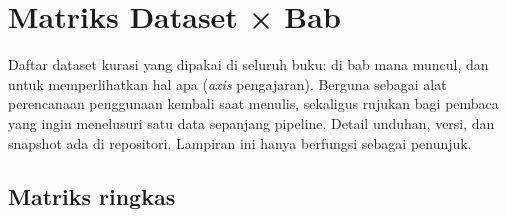 \chapter{Matriks Dataset × Bab}\label{matriks-dataset-bab}

Daftar dataset kurasi yang dipakai di seluruh buku: di bab mana muncul, dan untuk memperlihatkan hal apa (\emph{axis} pengajaran). Berguna sebagai alat perencanaan penggunaan kembali saat menulis, sekaligus rujukan bagi pembaca yang ingin menelusuri satu data sepanjang pipeline. Detail unduhan, versi, dan snapshot ada di repositori. Lampiran ini hanya berfungsi sebagai penunjuk.

\section{Matriks ringkas}\label{matriks-ringkas}

